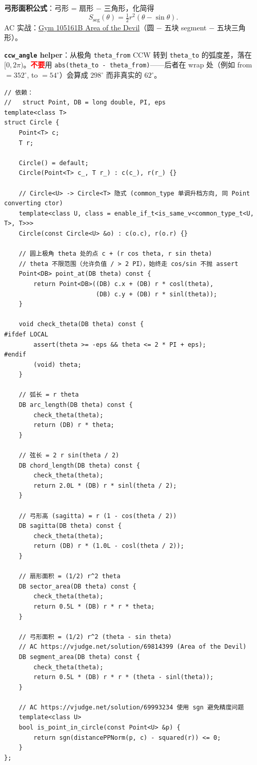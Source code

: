 		\textbf{弓形面积公式}：弓形 = 扇形 $-$ 三角形，化简得
		$$S_{\text{seg}}(\theta) = \tfrac{1}{2} r^2 (\theta - \sin \theta).$$
		AC 实战：\href{https://vjudge.net/problem/Gym-105161B}{Gym 105161B Area of the Devil}（圆 $-$ 五块 segment $-$ 五块三角形）。

		\textbf{\texttt{ccw\_angle} helper}：从极角 \texttt{theta\_from} CCW 转到 \texttt{theta\_to} 的弧度差，落在 $[0, 2\pi)$。\textcolor{red}{\textbf{不要}}用 \texttt{abs(theta\_to - theta\_from)}——后者在 wrap 处（例如 from $= 352^{\circ}$, to $= 54^{\circ}$）会算成 $298^{\circ}$ 而非真实的 $62^{\circ}$。

		\begin{verbatim}
// 依赖：
//   struct Point, DB = long double, PI, eps
template<class T>
struct Circle {
	Point<T> c;
	T r;

	Circle() = default;
	Circle(Point<T> c_, T r_) : c(c_), r(r_) {}

	// Circle<U> -> Circle<T> 隐式 (common_type 单调升档方向, 同 Point converting ctor)
	template<class U, class = enable_if_t<is_same_v<common_type_t<U, T>, T>>>
	Circle(const Circle<U> &o) : c(o.c), r(o.r) {}

	// 圆上极角 theta 处的点 c + (r cos theta, r sin theta)
	// theta 不限范围（允许负值 / > 2 PI），始终走 cos/sin 不抛 assert
	Point<DB> point_at(DB theta) const {
		return Point<DB>((DB) c.x + (DB) r * cosl(theta),
		                 (DB) c.y + (DB) r * sinl(theta));
	}

	void check_theta(DB theta) const {
#ifdef LOCAL
		assert(theta >= -eps && theta <= 2 * PI + eps);
#endif
		(void) theta;
	}

	// 弧长 = r theta
	DB arc_length(DB theta) const {
		check_theta(theta);
		return (DB) r * theta;
	}

	// 弦长 = 2 r sin(theta / 2)
	DB chord_length(DB theta) const {
		check_theta(theta);
		return 2.0L * (DB) r * sinl(theta / 2);
	}

	// 弓形高 (sagitta) = r (1 - cos(theta / 2))
	DB sagitta(DB theta) const {
		check_theta(theta);
		return (DB) r * (1.0L - cosl(theta / 2));
	}

	// 扇形面积 = (1/2) r^2 theta
	DB sector_area(DB theta) const {
		check_theta(theta);
		return 0.5L * (DB) r * r * theta;
	}

	// 弓形面积 = (1/2) r^2 (theta - sin theta)
	// AC https://vjudge.net/solution/69814399 (Area of the Devil)
	DB segment_area(DB theta) const {
		check_theta(theta);
		return 0.5L * (DB) r * r * (theta - sinl(theta));
	}

	// AC https://vjudge.net/solution/69993234 使用 sgn 避免精度问题
	template<class U>
	bool is_point_in_circle(const Point<U> &p) {
		return sgn(distancePPNorm(p, c) - squared(r)) <= 0;
	}
};
		\end{verbatim}

